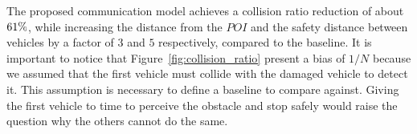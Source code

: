 The proposed communication model achieves a collision ratio reduction of about $\collision_ratio_reduction_perc\%$,
while increasing the distance from the $POI$ and the safety distance between vehicles by a factor of 
$3$ and $5$ respectively, compared to the baseline.
It is important to notice that Figure~\ref{fig:collision_ratio} present a bias of $1/N$ because we assumed that
the first vehicle must collide with the damaged vehicle to detect it. This assumption is necessary to define a
baseline to compare against. Giving the first vehicle to time to perceive the obstacle and stop safely would 
raise the question why the others cannot do the same.
